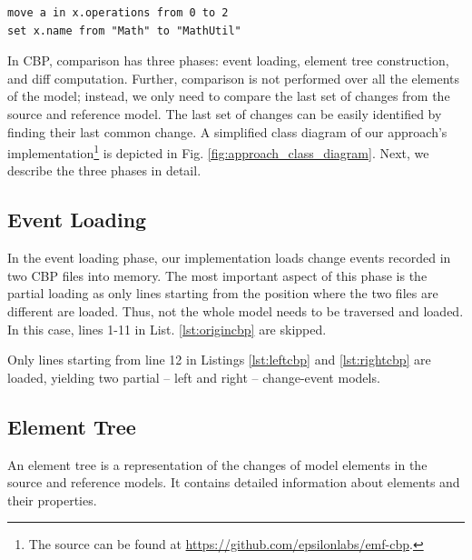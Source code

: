 \vspace{-15pt}
\begin{lstlisting}[firstnumber=12,style=eol,caption={The appended changes made by Alice to produce the model in Fig. \ref{fig:right} (right version).},label=lst:rightcbp]
move a in x.operations from 0 to 2
set x.name from "Math" to "MathUtil"
\end{lstlisting}

In CBP, comparison has three phases: event loading, element tree construction, and diff computation.
Further, comparison is not performed over all the elements of the model; instead, we only need to compare the last set of changes from the source and reference model.
The last set of changes can be easily identified by finding their last common change.
A simplified class diagram of our approach's implementation\footnote{The source can be found at \url{https://github.com/epsilonlabs/emf-cbp}.} is depicted in Fig. \ref{fig:approach_class_diagram}. 
Next, we describe the three phases in detail.

\subsection{Event Loading}
\label{sec:event_loading}
In the event loading phase, our implementation loads change events recorded in two CBP files into memory.
The most important aspect of this phase is the partial loading as only lines starting from the position where the two files are different are loaded.
Thus, not the whole model needs to be traversed and loaded.
In this case, lines 1-11 in List. \ref{lst:origincbp} are skipped.

Only lines starting from line 12 in Listings \ref{lst:leftcbp} and \ref{lst:rightcbp} are loaded, yielding two partial -- left and right -- change-event models. 

\subsection{Element Tree}
\label{sec:tree_construction}
An element tree is a representation of the changes of model elements in the source and reference models.
It contains detailed information about elements and their properties.


